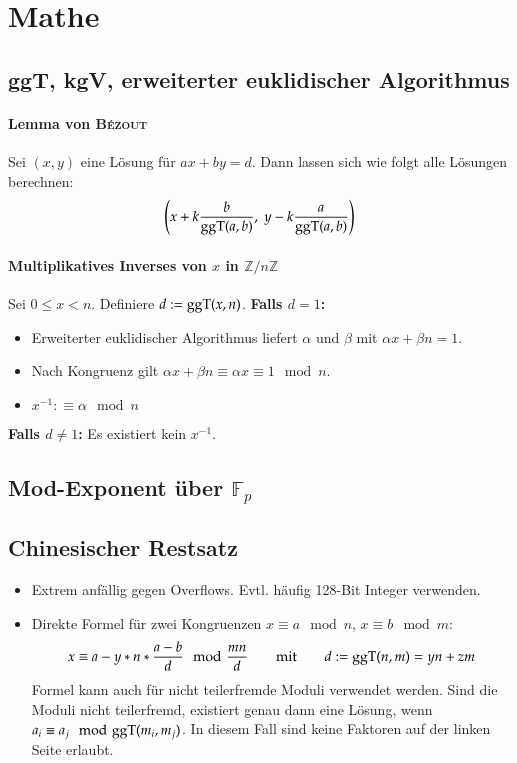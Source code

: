 \section{Mathe}

\subsection{ggT, kgV, erweiterter euklidischer Algorithmus}



\paragraph{Lemma von \textsc{Bézout}}
Sei $(x, y)$ eine Lösung für $ax + by = d$.
Dann lassen sich wie folgt alle Lösungen berechnen:
\[
	\left(x + k\frac{b}{\text{ggT}(a, b)},~y - k\frac{a}{\text{ggT}(a, b)}\right)
\]

\paragraph{Multiplikatives Inverses von $x$ in $\mathbb{Z}/n\mathbb{Z}$}
Sei $0 \leq x < n$. Definiere $d := \text{ggT}(x, n)$.\newline
\textbf{Falls $d = 1$:}
\begin{itemize}[nosep]
	\item Erweiterter euklidischer Algorithmus liefert $\alpha$ und $\beta$ mit
	$\alpha x + \beta n = 1$.
	\item Nach Kongruenz gilt $\alpha x + \beta n \equiv \alpha x \equiv 1 \mod n$.
	\item $x^{-1} :\equiv \alpha \mod n$
	\end{itemize}
\textbf{Falls $d \neq 1$:} Es existiert kein $x^{-1}$.


\subsection{Mod-Exponent über $\mathbb{F}_p$}


\subsection{Chinesischer Restsatz}
\begin{itemize}
	\item Extrem anfällig gegen Overflows. Evtl. häufig 128-Bit Integer verwenden.
	\item Direkte Formel für zwei Kongruenzen $x \equiv a \mod n$, $x \equiv b \mod m$:
	\[
		x \equiv a - y * n * \frac{a - b}{d} \mod \frac{mn}{d}
		\qquad \text{mit} \qquad
		d := \text{ggT}(n, m) = yn + zm
	\]
	Formel kann auch für nicht teilerfremde Moduli verwendet werden.
	Sind die Moduli nicht teilerfremd, existiert genau dann eine Lösung,
	wenn $a_i \equiv a_j \mod {\text{ggT}}(m_i, m_j)$.
	In diesem Fall sind keine Faktoren
	auf der linken Seite erlaubt.
\end{itemize}


